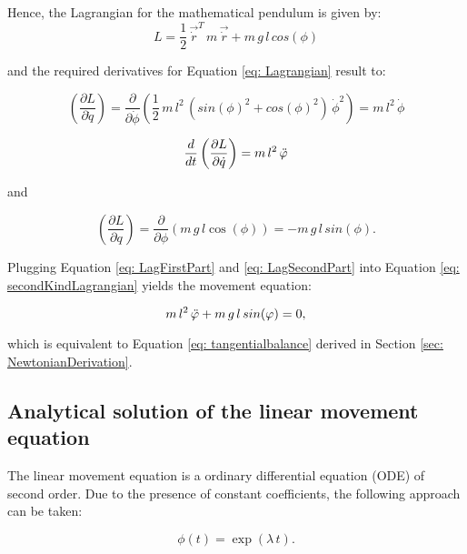 \documentclass[12pt,bibstyle=none,pagenumberinfooter]{ifmdocument}
\begin{document}
Hence, the Lagrangian for the mathematical pendulum is given by:
\begin{equation}
    L = \frac{1}{2}\,\Vec{\Dot{r}}^T\,m\,\Vec{\Dot{r}} + m\,g\,l\,cos(\phi)
\end{equation}

and the required derivatives for Equation \ref{eq: Lagrangian} result to:

\begin{equation}
    \left(\frac{\partial L}{\partial \Dot{q}}\right) = \frac{\partial}{\partial \Dot{\phi}} \left( \frac{1}{2}\,m\,l^2\,(sin(\phi)^2 + cos(\phi)^2)\,\Dot{\phi}^2 \right) = m\,l^2\,\Dot{\phi}
\end{equation}

\begin{equation}
    \label{eq: LagFirstPart}
    \frac{d}{dt}\left(\frac{\partial L}{\partial \Dot{q}}\right) = m\,l^2\,\Ddot{\phi}
\end{equation}

and

\begin{equation}
    \label{eq: LagSecondPart}
    \left(\frac{\partial L}{\partial q}  \right) = \frac{\partial}{\partial \phi} \left(m\,g\,l\cos(\phi)\right) = -m\,g\,l\,sin(\phi).
\end{equation}

Plugging Equation \ref{eq: LagFirstPart} and \ref{eq: LagSecondPart} into Equation \ref{eq: secondKindLagrangian} yields the movement equation:

\begin{equation}
    m\,l^2\,\Ddot{\phi} + m\,g\,l\,sin(\phi) = 0,
\end{equation}

which is equivalent to Equation \ref{eq: tangentialbalance} derived in Section \ref{sec: NewtonianDerivation}.


\subsection{Analytical solution of the linear movement equation}

The linear movement equation is a ordinary differential equation (ODE) of second order. Due to the presence of constant coefficients, the following approach can be taken:

\begin{equation}
    \label{eq: linear}
    \phi (t) = \exp{(\lambda \, t)}.
\end{equation}
\end{document}
